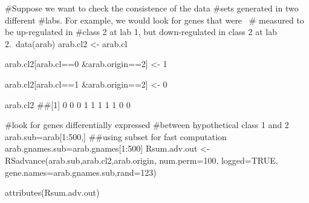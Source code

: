 \begin{Examples}
\begin{ExampleCode}
      
      #Suppose we want to check the consistence of the data 
      #sets generated in two different 
      #labs. For example, we would look for genes that were \
      # measured to be up-regulated in 
      #class 2 at lab 1, but down-regulated in class 2 at lab 2.\
       data(arab)
      arab.cl2 <- arab.cl

      arab.cl2[arab.cl==0 &arab.origin==2] <- 1

      arab.cl2[arab.cl==1 &arab.origin==2] <- 0

      arab.cl2
  ##[1] 0 0 0 1 1 1 1 1 0 0

      #look for genes differentially expressed
      #between hypothetical class 1 and 2
      arab.sub=arab[1:500,] ##using subset for fast computation
      arab.gnames.sub=arab.gnames[1:500]
      Rsum.adv.out <- RSadvance(arab.sub,arab.cl2,arab.origin,
                          num.perm=100,
logged=TRUE,
                          gene.names=arab.gnames.sub,rand=123)

      attributes(Rsum.adv.out)
      
\end{ExampleCode}
\end{Examples}

